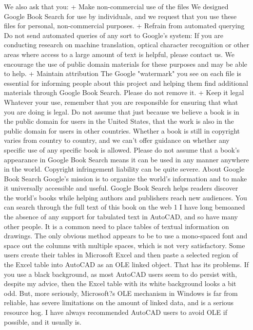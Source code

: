 \documentclass[a4paper]{article}
\newcommand\parttwo[1]{{   \fontspec{CAMBERIC.TTF} \fontsize{6}{12}  \selectfont #1}}
\begin{document}
\parttwo{
We also ask that you: 
+ Make non-commercial use of the files We designed Google Book Search for use by individuals, and we request that you use these files for 
personal, non-commercial purposes. 
+ Refrain from automated querying Do not send automated queries of any sort to Google's system: If you are conducting research on machine 
translation, optical character recognition or other areas where access to a large amount of text is helpful, please contact us. We encourage the 
use of public domain materials for these purposes and may be able to help. 
+ Maintain attribution The Google "watermark" you see on each file is essential for informing people about this project and helping them find 
additional materials through Google Book Search. Please do not remove it. 
+ Keep it legal Whatever your use, remember that you are responsible for ensuring that what you are doing is legal. Do not assume that just 
because we believe a book is in the public domain for users in the United States, that the work is also in the public domain for users in other 
countries. Whether a book is still in copyright varies from country to country, and we can't offer guidance on whether any specific use of 
any specific book is allowed. Please do not assume that a book's appearance in Google Book Search means it can be used in any manner 
anywhere in the world. Copyright infringement liability can be quite severe. 
About Google Book Search 
Google's mission is to organize the world's information and to make it universally accessible and useful. Google Book Search helps readers 
discover the world's books while helping authors and publishers reach new audiences. You can search through the full text of this book on the web 1
I have long bemoaned the absence of any support for tabulated text in AutoCAD, and so have many other people. It is a common need to place tables of textual information on drawings. The only obvious method appears to be to use a mono-spaced font and space out the columns with multiple spaces, which is not very satisfactory.
Some users create their tables in Microsoft Excel and then paste a selected region of the Excel table into AutoCAD as an OLE linked object. That has its problems. If you use a black background, as most AutoCAD users seem to do persist with, despite my advice, then the Excel table with its white background looks a bit odd. But, more seriously, Microsoft?s OLE mechanism in Windows is far from reliable, has severe limitations on the amount of linked data, and is a serious resource hog. I have always recommended AutoCAD users to avoid OLE if possible, and it usually is.
}
\end{document}
